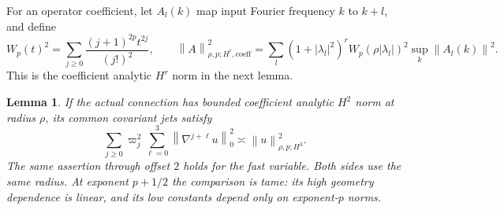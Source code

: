 \documentclass[11pt,a4paper]{article}
\numberwithin{equation}{section}
\newtheorem{lemma}[theorem]{Lemma}
\theoremstyle{remark}
\newcommand{\norm}[1]{\left\lVert #1\right\rVert}
\begin{document}
For an operator coefficient, let \(A_l(k)\) map input Fourier frequency
\(k\) to \(k+l\), and define
\[
 W_p(t)^2=\sum_{j\geq0}\frac{(j+1)^{2p}t^{2j}}{(j!)^2},\qquad
 \norm A_{\rho,p;H^r,\mathrm{coeff}}^2
 =\sum_l(1+|\lambda_l|^2)^rW_p(\rho|\lambda_l|)^2
                                      \sup_k\norm{A_l(k)}^2.
\]
This is the coefficient analytic \(H^r\) norm in the next lemma.
\begin{lemma}\label{lem:same-radius}
If the actual connection has bounded coefficient analytic \(H^2\)
norm at radius \(\rho\), its common covariant jets satisfy
\[
 \sum_{j\geq0}\varpi_j^2\sum_{\ell=0}^3
                  \norm{\nabla^{j+\ell}u}_0^2
       \asymp\norm u_{\rho,p;H^3}^2 .
\]
The same assertion through offset \(2\) holds for the fast variable.
Both sides use the same radius. At exponent \(p+1/2\) the comparison
is tame: its high geometry dependence is linear, and its low
constants depend only on exponent-\(p\) norms.
\end{lemma}
\end{document}
